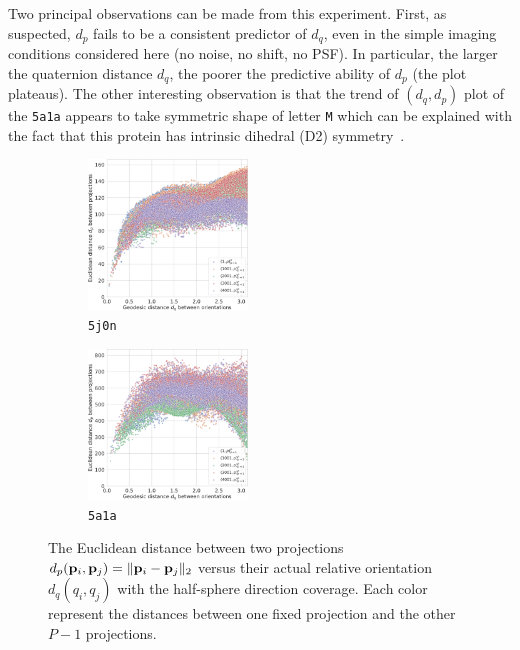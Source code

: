 Two principal observations can be made from this experiment.
First, as suspected, $d_p$ fails to be a consistent predictor of $d_q$, even in the simple imaging conditions considered here (no noise, no shift, no PSF).
In particular, the larger the quaternion distance $d_q$, the poorer the predictive ability of $d_p$ (the plot plateaus).
The other interesting observation is that the trend of $(d_q,d_p)$ plot of the \texttt{5a1a} appears to take symmetric shape of letter \texttt{M} which can be explained with the fact that this protein has intrinsic dihedral (D2) symmetry~\cite{noauthor_d2sym_nodate,noauthor_5a1asym_nodate}.

\begin{figure}[ht!]
    \begin{minipage}[t]{0.57\linewidth}
        \begin{subfigure}[t]{0.48\textwidth}
            \centering
            \includegraphics[height=4cm]{figures/eucl_notrobust_5j0n}
            \caption{\texttt{5j0n}}
        \end{subfigure}
        \hfill
        \begin{subfigure}[t]{0.48\textwidth}
            \centering
            \includegraphics[height=4cm]{figures/eucl_notrobust_5a1a}
            \caption{\texttt{5a1a}}\label{fig:euclidean-not-robust:5a1a}
        \end{subfigure}
        \caption{%
            The Euclidean distance between two projections $d_p(\mathbf{p}_i, \mathbf{p}_j) = \Vert \mathbf{p}_i - \mathbf{p}_j \Vert_2$ versus their actual relative orientation $d_q(q_i, q_j)$ with the half-sphere direction coverage.
            Each color represent the distances between one fixed projection and the other $P-1$ projections.
}
\end{minipage}
\end{figure}
